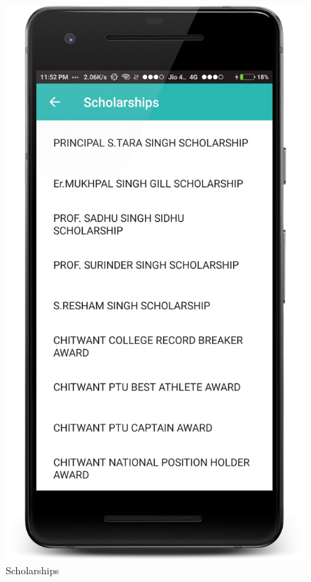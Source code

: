 \begin{figure}[ht]
\centering
\includegraphics[scale=0.20]{images/S6.png}
\caption{Scholarships}
\end{figure}

\newpage

